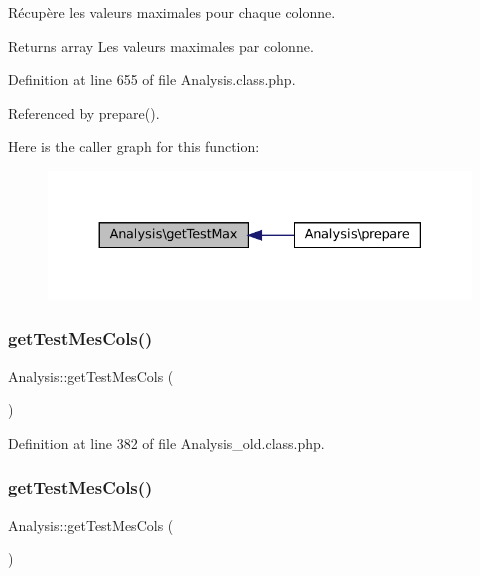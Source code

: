 Récupère les valeurs maximales pour chaque colonne.

\begin{DoxyReturn}{Returns}
array Les valeurs maximales par colonne. 
\end{DoxyReturn}


Definition at line 655 of file Analysis.\+class.\+php.



Referenced by prepare().

Here is the caller graph for this function\+:\nopagebreak
\begin{figure}[H]
\begin{center}
\leavevmode
\includegraphics[width=330pt]{class_analysis_aa62e20d065337e6c23e2840e02235b69_icgraph}
\end{center}
\end{figure}
\mbox{\label{class_analysis_aa52531fa97647772150dd607133bd355}} 
\subsubsection{\texorpdfstring{get\+Test\+Mes\+Cols()}{getTestMesCols()}\hspace{0.1cm}{\footnotesize\ttfamily [1/2]}}
{\footnotesize\ttfamily Analysis\+::get\+Test\+Mes\+Cols (\begin{DoxyParamCaption}{ }\end{DoxyParamCaption})\hspace{0.3cm}{\ttfamily [protected]}}



Definition at line 382 of file Analysis\+\_\+old.\+class.\+php.

\mbox{\label{class_analysis_aa52531fa97647772150dd607133bd355}} 
\subsubsection{\texorpdfstring{get\+Test\+Mes\+Cols()}{getTestMesCols()}\hspace{0.1cm}{\footnotesize\ttfamily [2/2]}}
{\footnotesize\ttfamily Analysis\+::get\+Test\+Mes\+Cols (\begin{DoxyParamCaption}{ }\end{DoxyParamCaption})\hspace{0.3cm}{\ttfamily [protected]}}

